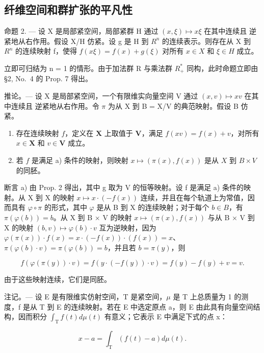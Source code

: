 \subsection{纤维空间和群扩张的平凡性}

命题 2. --- 设 X 是局部紧空间，局部紧群 H 通过 \((x,\xi)\mapsto x\xi\) 在其中连续且 逆紧地从右作用。假设 X/H 仿紧。设 g 是 H 到 \(R^{n}\) 的连续表示。则存在从 X 到 \(R^{n}\) 的连续映射 f，使得 \(f(x\xi)=f(x)+g(\xi)\) 对所有 \(x\in X\) 和 \(\xi\in H\) 成立。

立即可归结为 n = 1 的情形。由于加法群 R 与乘法群 \(R_{+}^{*}\) 同构，此时命题立即由 §2, No.~4 的 Prop. 7 得出。

推论。--- 设 X 是局部紧空间，一个有限维实向量空间 V 通过 \((x,v)\mapsto xv\) 在其中连续且 逆紧地从右作用。令 \(\pi\) 为从 X 到 B = X/V 的典范映射。假设 B 仿紧。

\begin{enumerate}
\def\labelenumi{\alph{enumi})}
\item
  存在连续映射 \(f\)，定义在 \(\mathbf{X}\) 上取值于 \(\mathbf{V}\)，满足 \(f(xv) = f(x) + v\)，对所有 \(x \in \mathbf{X}\) 和 \(v \in \mathbf{V}\) 成立。
\item
  若 \(f\) 是满足 a) 条件的映射，则映射 \(x \mapsto (\pi(x), f(x))\) 是从 \(X\) 到 \(B \times V\) 的同胚。
\end{enumerate}

断言 a) 由 Prop. 2 得出，其中 g 取为 V 的恒等映射。设 f 是满足 a) 条件的映射。从 X 到 X 的映射 \(x \mapsto x \cdot (-f(x))\) 连续，并且在每个轨道上为常值，因而具有 \(\varphi \circ \pi\) 的形式，其中 \(\varphi\) 是从 B 到 X 的连续映射；对于每个 \(b \in B\)，有 \(\pi(\varphi(b)) = b\)。从 X 到 B × V 的映射 \(x \mapsto (\pi(x), f(x))\) 与从 B × V 到 X 的映射 \((b, v) \mapsto \varphi(b) \cdot v\) 互为逆映射，因为 \(\varphi(\pi(x)) \cdot f(x) = x \cdot (-f(x)) \cdot (f(x)) = x\)、\(\pi(\varphi(b) \cdot v) = \pi(\varphi(b)) = b\)，并且若 \(b = \pi(y)\)，则

\[
f (\varphi (\pi (y)) \cdot v) = f (y \cdot (- f (y)) \cdot v) = f (y) - f (y) + v = v.
\]

由于这些映射连续，它们是同胚。

注记。--- 设 E 是有限维实仿射空间，T 是紧空间，\(\mu\) 是 T 上总质量为 1 的测度，f 是从 T 到 E 的连续映射。若在 E 中选定原点 a，则 E 由此具有向量空间结构，因而积分 \(\int_{\mathrm{T}} f(t) d\mu(t)\) 有意义；它表示 E 中满足下式的点 x：

\[
x - a = \int_ {\mathrm{T}} (f (t) - a) d \mu (t).
\]

